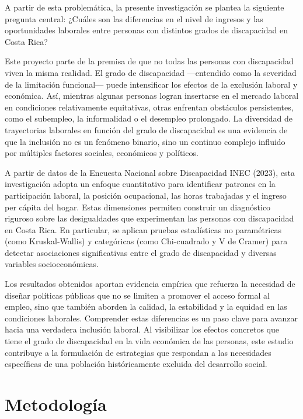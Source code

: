 \documentclass[
  11pt,
  oneside]{article}
\begin{document}
A partir de esta problemática, la presente investigación se plantea la
siguiente pregunta central: ¿Cuáles son las diferencias en el nivel de
ingresos y las oportunidades laborales entre personas con distintos
grados de discapacidad en Costa Rica?

Este proyecto parte de la premisa de que no todas las personas con
discapacidad viven la misma realidad. El grado de discapacidad
---entendido como la severidad de la limitación funcional--- puede
intensificar los efectos de la exclusión laboral y económica. Así,
mientras algunas personas logran insertarse en el mercado laboral en
condiciones relativamente equitativas, otras enfrentan obstáculos
persistentes, como el subempleo, la informalidad o el desempleo
prolongado. La diversidad de trayectorias laborales en función del grado
de discapacidad es una evidencia de que la inclusión no es un fenómeno
binario, sino un continuo complejo influido por múltiples factores
sociales, económicos y políticos.

A partir de datos de la Encuesta Nacional sobre Discapacidad INEC
(2023), esta investigación adopta un enfoque cuantitativo para
identificar patrones en la participación laboral, la posición
ocupacional, las horas trabajadas y el ingreso per cápita del hogar.
Estas dimensiones permiten construir un diagnóstico riguroso sobre las
desigualdades que experimentan las personas con discapacidad en Costa
Rica. En particular, se aplican pruebas estadísticas no paramétricas
(como Kruskal-Wallis) y categóricas (como Chi-cuadrado y V de Cramer)
para detectar asociaciones significativas entre el grado de discapacidad
y diversas variables socioeconómicas.

Los resultados obtenidos aportan evidencia empírica que refuerza la
necesidad de diseñar políticas públicas que no se limiten a promover el
acceso formal al empleo, sino que también aborden la calidad, la
estabilidad y la equidad en las condiciones laborales. Comprender estas
diferencias es un paso clave para avanzar hacia una verdadera inclusión
laboral. Al visibilizar los efectos concretos que tiene el grado de
discapacidad en la vida económica de las personas, este estudio
contribuye a la formulación de estrategias que respondan a las
necesidades específicas de una población históricamente excluida del
desarrollo social.

\section{Metodología}\label{metodologuxeda}
\end{document}

